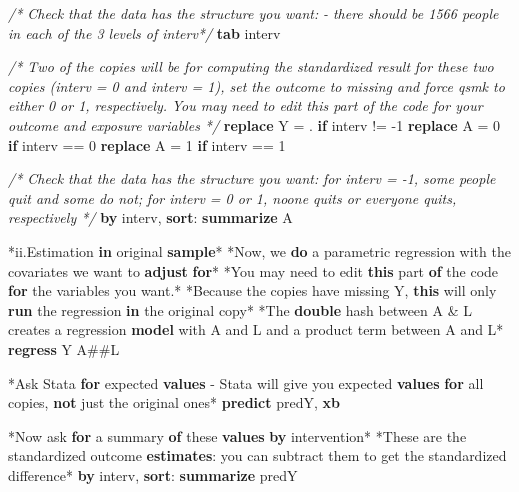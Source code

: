 \documentclass[
  10pt,
]{book}
\newenvironment{Shaded}{\begin{snugshade}}{\end{snugshade}}
\newcommand{\CommentTok}[1]{\textcolor[rgb]{0.56,0.35,0.01}{\textit{#1}}}
\newcommand{\FunctionTok}[1]{\textcolor[rgb]{0.00,0.00,0.00}{#1}}
\newcommand{\KeywordTok}[1]{\textcolor[rgb]{0.13,0.29,0.53}{\textbf{#1}}}
\newcommand{\NormalTok}[1]{#1}
\newcommand{\OtherTok}[1]{\textcolor[rgb]{0.56,0.35,0.01}{#1}}
\begin{document}
\begin{Shaded}
\begin{Highlighting}[]
\CommentTok{/* Check that the data has the structure you want: }
\CommentTok{ {-} there should be 1566 people in each of the 3 levels of interv*/}
\KeywordTok{tab}\NormalTok{ interv}

\CommentTok{/* Two of the copies will be for computing the standardized result}
\CommentTok{for these two copies (interv = 0 and interv = 1), set the outcome to}
\CommentTok{missing and force qsmk to either 0 or 1, respectively.}
\CommentTok{You may need to edit this part of the code for your outcome and exposure variables */}
\KeywordTok{replace}\NormalTok{ Y = . }\KeywordTok{if}\NormalTok{ interv != {-}1}
\KeywordTok{replace}\NormalTok{ A = 0 }\KeywordTok{if}\NormalTok{ interv == 0}
\KeywordTok{replace}\NormalTok{ A = 1 }\KeywordTok{if}\NormalTok{ interv == 1}

\CommentTok{/* Check that the data has the structure you want: }
\CommentTok{for interv = {-}1, some people quit and some do not; }
\CommentTok{for interv = 0 or 1, noone quits or everyone quits, respectively */}
\KeywordTok{by}\NormalTok{ interv, }\KeywordTok{sort}\NormalTok{: }\KeywordTok{summarize}\NormalTok{ A}

\NormalTok{*ii.Estimation }\KeywordTok{in}\NormalTok{ original }\KeywordTok{sample}\NormalTok{*}
\NormalTok{*Now, we }\KeywordTok{do}\NormalTok{ a parametric regression with the covariates we want to }\KeywordTok{adjust} \KeywordTok{for}\NormalTok{*}
\NormalTok{*You may need to edit }\KeywordTok{this}\NormalTok{ part }\KeywordTok{of}\NormalTok{ the code }\KeywordTok{for}\NormalTok{ the variables you want.*}
\NormalTok{*Because the copies have }\FunctionTok{missing}\NormalTok{ Y, }\KeywordTok{this}\NormalTok{ will only }\KeywordTok{run}\NormalTok{ the regression }\KeywordTok{in}\NormalTok{ the original copy*}
\NormalTok{*The }\KeywordTok{double}\NormalTok{ hash between A \& L creates a regression }\KeywordTok{model}\NormalTok{ with A and L and a product term between A and L*}
\KeywordTok{regress}\NormalTok{ Y A\#\#L}

\NormalTok{*Ask Stata }\KeywordTok{for}\NormalTok{ expected }\KeywordTok{values}\NormalTok{ {-} Stata will give you expected }\KeywordTok{values} \KeywordTok{for} \OtherTok{all}\NormalTok{ copies, }\KeywordTok{not}\NormalTok{ just the original ones*}
\KeywordTok{predict}\NormalTok{ predY, }\KeywordTok{xb}

\NormalTok{*Now ask }\KeywordTok{for}\NormalTok{ a summary }\KeywordTok{of}\NormalTok{ these }\KeywordTok{values} \KeywordTok{by}\NormalTok{ intervention*}
\NormalTok{*These are the standardized outcome }\KeywordTok{estimates}\NormalTok{: you can subtract them to }\FunctionTok{get}\NormalTok{ the standardized difference*}
\KeywordTok{by}\NormalTok{ interv, }\KeywordTok{sort}\NormalTok{: }\KeywordTok{summarize}\NormalTok{ predY}


\end{Highlighting}
\end{Shaded}
\end{document}
